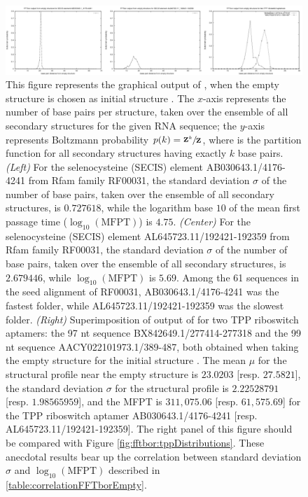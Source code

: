 \begin{figure}[!h]
\centering
\includegraphics[width=\textwidth]{Figures/FFTbor/correlationFFTborEmpty.pdf}
\caption{This figure represents the
graphical output of \fftbor, when the empty structure is chosen as
initial structure \strSt.
The $x$-axis represents the number of base pairs per structure,
taken over the ensemble of all secondary structures for the given RNA
sequence; the $y$-axis represents Boltzmann probability
$p(k) = \sfrac{{\bf Z}^{k}_{}}{{\bf Z}^{}_{}}$,
where \bfZ{}{} is the partition function for all secondary structures
having exactly $k$ base pairs.
{\em (Left)}
For the selenocysteine (SECIS) element AB030643.1/4176-4241 from Rfam family
RF00031, the standard deviation $\sigma$ of the number of base pairs,
taken over the ensemble of all secondary structures, is
$0.727618$, while the logarithm base $10$ of the mean first passage time ($\log_{10}(\text{MFPT})$)
is $4.75$.
{\em (Center)}
For the selenocysteine (SECIS) element
AL645723.11/192421-192359 from Rfam family
RF00031, the standard deviation $\sigma$ of the number of base pairs,
taken over the ensemble of all secondary structures, is
$2.679446$, while $\log_{10}(\text{MFPT})$ is $5.69$.
Among the 61 sequences in the seed alignment of RF00031,
AB030643.1/4176-4241 was the fastest folder, while
AL645723.11/192421-192359 was the slowest folder.
{\em (Right)}
Superimposition of output of \fftbor for two TPP riboswitch aptamers: the
97 nt sequence BX842649.1/277414-277318 and the
99 nt sequence AACY022101973.1/389-487, both obtained when
taking the empty structure for the initial structure \strSt.
The mean $\mu$ for the \fftbor structural profile near the empty
structure is $23.0203$  [resp. $27.5821$], the
standard deviation $\sigma$ for the \fftbor structural profile
is $2.22528791$  [resp. $1.98565959$], and the \kinfold MFPT is
$311,075.06$ [resp. $61,575.69$] for the TPP riboswitch aptamer
AB030643.1/4176-4241 [resp.  AL645723.11/192421-192359].
The right panel of this figure should be compared with Figure
\ref{fig:fftbor:tppDistributions}.
These anecdotal results bear up the correlation between standard deviation
$\sigma$ and $\log_{10}(\text{MFPT})$ described in \ref{table:correlationFFTborEmpty}.
}
\label{fig:fftbor:correlationFFTborEmpty}
\end{figure}

